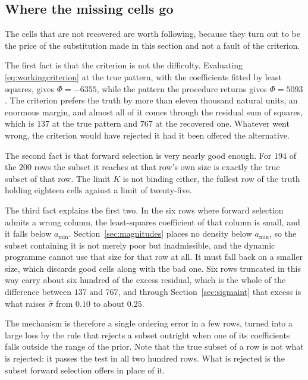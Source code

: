 \subsection{Where the missing cells go}
\label{sec:whymissed}

The cells that are not recovered are worth following, because they turn out to be
the price of the substitution made in this section and not a fault of the criterion.

The first fact is that the criterion is not the difficulty. Evaluating
\eqref{eq:workingcriterion} at the true pattern, with the coefficients fitted by
least squares, gives $\Phi = -6355$, while the pattern the procedure returns gives
$\Phi = 5093$. The criterion prefers the truth by more than eleven thousand natural
units, an enormous margin, and almost all of it comes through the residual sum of
squares, which is $137$ at the true pattern and $767$ at the recovered one. Whatever
went wrong, the criterion would have rejected it had it been offered the alternative.

The second fact is that forward selection is very nearly good enough. For $194$ of
the $200$ rows the subset it reaches at that row's own size is exactly the true
subset of that row. The limit $K$ is not binding either, the fullest row of the truth
holding eighteen cells against a limit of twenty-five.

The third fact explains the first two. In the six rows where forward selection admits
a wrong column, the least-squares coefficient of that column is small, and it falls
below $a_{\min}$. Section~\ref{sec:magnitudes} places no density below $a_{\min}$, so
the subset containing it is not merely poor but inadmissible, and the dynamic
programme cannot use that size for that row at all. It must fall back on a smaller
size, which discards good cells along with the bad one. Six rows truncated in this
way carry about six hundred of the excess residual, which is the whole of the
difference between $137$ and $767$, and through
Section~\ref{sec:sigmaint} that excess is what raises $\hat\sigma$ from $0.10$ to
about $0.25$.

The mechanism is therefore a single ordering error in a few rows, turned into a large
loss by the rule that rejects a subset outright when one of its coefficients falls
outside the range of the prior. Note that the true subset of a row is not what is
rejected: it passes the test in all two hundred rows. What is rejected is the subset
forward selection offers in place of it.

